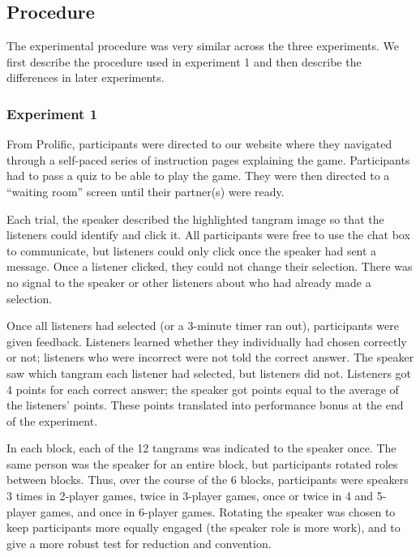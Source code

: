 \documentclass[
  english,
  a4paper,
]{article}
\begin{document}
\hypertarget{procedure}{%
\subsection{Procedure}\label{procedure}}

The experimental procedure was very similar across the three experiments. We first describe the procedure used in experiment 1 and then describe the differences in later experiments.

\hypertarget{experiment-1}{%
\subsubsection{Experiment 1}\label{experiment-1}}

From Prolific, participants were directed to our website where they navigated through a self-paced series of instruction pages explaining the game. Participants had to pass a quiz to be able to play the game. They were then directed to a ``waiting room'' screen until their partner(s) were ready.

Each trial, the speaker described the highlighted tangram image so that the listeners could identify and click it. All participants were free to use the chat box to communicate, but listeners could only click once the speaker had sent a message. Once a listener clicked, they could not change their selection. There was no signal to the speaker or other listeners about who had already made a selection.

Once all listeners had selected (or a 3-minute timer ran out), participants were given feedback. Listeners learned whether they individually had chosen correctly or not; listeners who were incorrect were not told the correct answer. The speaker saw which tangram each listener had selected, but listeners did not. Listeners got 4 points for each correct answer; the speaker got points equal to the average of the listeners' points. These points translated into performance bonus at the end of the experiment.

In each block, each of the 12 tangrams was indicated to the speaker once. The same person was the speaker for an entire block, but participants rotated roles between blocks. Thus, over the course of the 6 blocks, participants were speakers 3 times in 2-player games, twice in 3-player games, once or twice in 4 and 5-player games, and once in 6-player games. Rotating the speaker was chosen to keep participants more equally engaged (the speaker role is more work), and to give a more robust test for reduction and convention.
\end{document}
